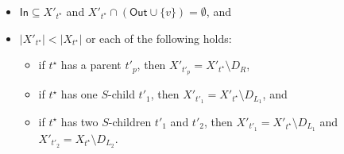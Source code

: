 \documentclass[a4paper,UKenglish,cleveref, autoref, thm-restate, numberwithinsect]{lipics-v2021}
\newcommand{\In}{\mathsf{In}}
\newcommand{\Out}{\mathsf{Out}}
\begin{document}
\begin{lemma}
\begin{itemize}
\item $\In\subseteq X'_{t^{\star}}$ and $X'_{t^{\star}}\cap (\Out\cup\{v\})=\emptyset$, and
\item $|X'_{t^{\star}}|<|X_{t^{\star}}|$ or each of the following holds:
\begin{itemize}
    \item if $t^{\star}$ has a parent $t'_p$, then $X'_{t'_p}=X'_{t^{\star}}\setminus D_R$, 
    \item if $t^{\star}$ has one $S$-child $t'_1$, then $X'_{t'_1}=X'_{t^{\star}}\setminus D_{L_1}$, and 
    \item if $t^{\star}$ has two $S$-children $t'_1$ and $t'_2$, then $X'_{t'_1}=X'_{t^{\star}}\setminus D_{L_1}$ and $X'_{t'_2}=X_{t^{\star}}\setminus D_{L_2}$.
\end{itemize}
\end{itemize}
\end{lemma}
\end{document}
